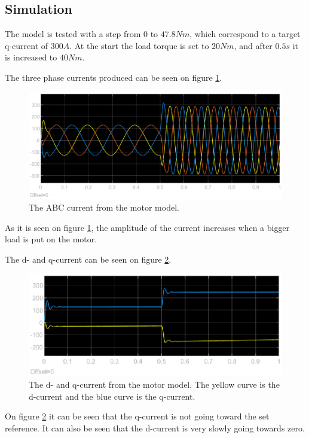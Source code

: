 \subsection{Simulation}
\label{sec:simulation}
The model is tested with a step from $0$ to $47.8 Nm$, which correspond to a target q-current of $300 A $. At the start the load torque is set to $20 Nm$, and after $0.5 s$ it is increased to $40 Nm$. 

The three phase currents produced can be seen on figure \ref{fig:iabc}.

\begin{figure}[H]
	\centering
	\includegraphics[width=0.9\linewidth]{pictures/control/iabc.eps}
	\caption{The ABC current from the motor model.}
	\label{fig:iabc}
\end{figure}

As it is seen on figure \ref{fig:iabc}, the amplitude of the current increases when a bigger load is put on the motor. 

The d- and q-current can be seen on figure \ref{fig:idq}.

\begin{figure}[H]
	\centering
	\includegraphics[width=0.9\linewidth]{pictures/control/idq.eps}
	\caption{The d- and q-current from the motor model. The yellow curve is the d-current and the blue curve is the q-current.}
	\label{fig:idq}
\end{figure}

On figure \ref{fig:idq} it can be seen that the q-current is not going toward the set reference. It can also be seen that the d-current is very slowly going towards zero.


